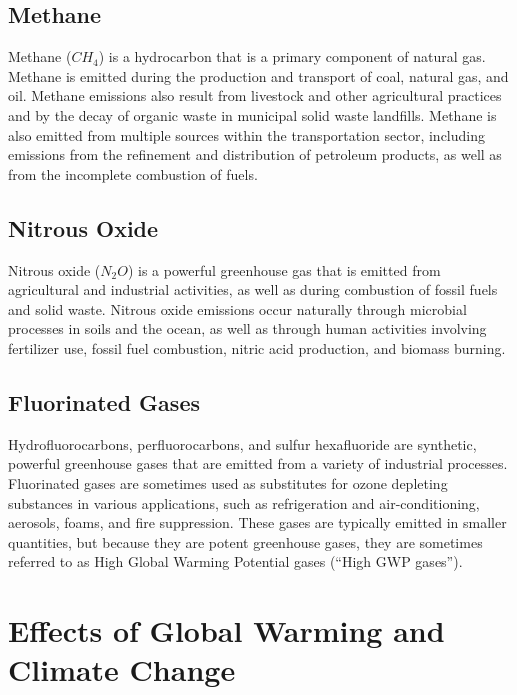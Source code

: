 \documentclass{article}
\begin{document}
\subsection{Methane}
Methane ($CH_4$) is a hydrocarbon that is a primary component of natural gas.
Methane is emitted during the production and transport of coal, natural gas,
and oil. Methane emissions also result from livestock and other agricultural
practices and by the decay of organic waste in municipal solid waste landfills.
Methane is also emitted from multiple sources within the transportation
sector, including emissions from the refinement and distribution of petroleum
products, as well as from the incomplete combustion of fuels.

\subsection{Nitrous Oxide}
Nitrous oxide ($N_2O$) is a powerful greenhouse gas that is emitted from
agricultural and industrial activities, as well as during combustion of fossil
fuels and solid waste. Nitrous oxide emissions occur naturally through
microbial processes in soils and the ocean, as well as through human activities
involving fertilizer use, fossil fuel combustion, nitric acid production, and
biomass burning.

\subsection{Fluorinated Gases}
Hydrofluorocarbons, perfluorocarbons, and sulfur hexafluoride are synthetic,
powerful greenhouse gases that are emitted from a variety of industrial
processes. Fluorinated gases are sometimes used as substitutes for ozone
depleting substances in various applications, such as refrigeration and
air-conditioning, aerosols, foams, and fire suppression. These gases are
typically emitted in smaller quantities, but because they are potent greenhouse
gases, they are sometimes referred to as High Global Warming Potential gases
(``High GWP gases'').

\section{Effects of Global Warming and Climate Change}
\end{document}
